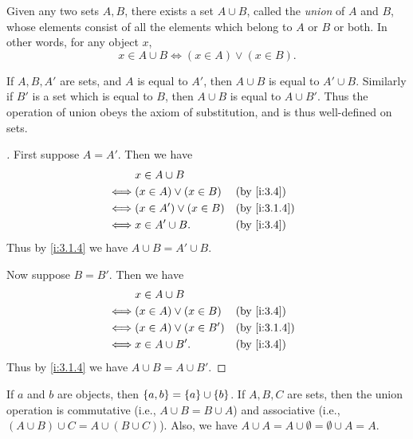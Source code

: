 \begin{ax}\label{i:3.4}
  Given any two sets \(A, B\), there exists a set \(A \cup B\), called the \emph{union} of \(A\) and \(B\), whose elements consist of all the elements which belong to \(A\) or \(B\) or both.
  In other words, for any object \(x\),
  \[
    x \in A \cup B \iff (x \in A) \lor (x \in B).
  \]
\end{ax}

\setcounter{thm}{11}
\begin{rmk}\label{i:3.1.12}
  If \(A, B, A'\) are sets, and \(A\) is equal to \(A'\), then \(A \cup B\) is equal to \(A' \cup B\).
  Similarly if \(B'\) is a set which is equal to \(B\), then \(A \cup B\) is equal to \(A \cup B'\).
  Thus the operation of union obeys the axiom of substitution, and is thus well-defined on sets.
\end{rmk}

\begin{proof}[]
  First suppose \(A = A'\).
  Then we have
  \begin{align*}
         & x \in A \cup B                              \\
    \iff & (x \in A) \lor (x \in B)  &  & \by{i:3.4}   \\
    \iff & (x \in A') \lor (x \in B) &  & \by{i:3.1.4} \\
    \iff & x \in A' \cup B.          &  & \by{i:3.4}
  \end{align*}
  Thus by \cref{i:3.1.4} we have \(A \cup B = A' \cup B\).

  Now suppose \(B = B'\).
  Then we have
  \begin{align*}
         & x \in A \cup B                              \\
    \iff & (x \in A) \lor (x \in B)  &  & \by{i:3.4}   \\
    \iff & (x \in A) \lor (x \in B') &  & \by{i:3.1.4} \\
    \iff & x \in A \cup B'.          &  & \by{i:3.4}
  \end{align*}
  Thus by \cref{i:3.1.4} we have \(A \cup B = A \cup B'\).
\end{proof}

\begin{lem}\label{i:3.1.13}
  If \(a\) and \(b\) are objects, then \(\left\lbrace a, b\right\rbrace = \left\lbrace a\right\rbrace \cup \left\lbrace b\right\rbrace\).
  If \(A, B, C\) are sets, then the union operation is commutative (i.e., \(A \cup B = B \cup A\)) and associative (i.e., \((A \cup B) \cup C = A \cup (B \cup C)\)).
  Also, we have \(A \cup A = A \cup \emptyset = \emptyset \cup A = A\).
\end{lem}

